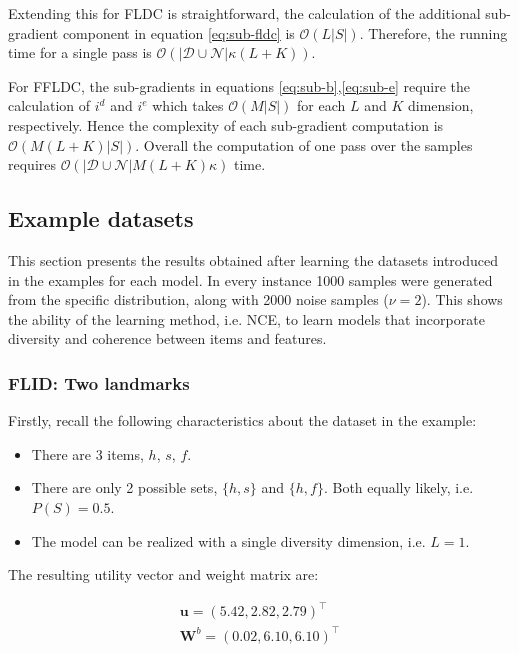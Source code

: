 Extending this for FLDC is straightforward, the calculation of the additional sub-gradient component in equation \ref{eq:sub-fldc} is $\mathcal{O}(L|S|)$. Therefore, the running time for a single pass is $\mathcal{O}(|\mathcal{D}\cup\mathcal{N}|\kappa(L+K))$.

For FFLDC, the sub-gradients in equations \ref{eq:sub-b},\ref{eq:sub-e} require the calculation of $i^{d}$ and $i^{e}$ which takes $\mathcal{O}(M|S|)$ for each $L$ and $K$ dimension, respectively. Hence the complexity of each sub-gradient computation is $\mathcal{O}(M(L+K)|S|)$. Overall the computation of one pass over the samples requires $\mathcal{O}(|\mathcal{D}\cup\mathcal{N}|M(L+K)\kappa)$ time.

\subsection{Example datasets}

This section presents the results obtained after learning the datasets introduced in the examples for each model. In every instance 1000 samples were generated from the specific distribution, along with 2000 noise samples ($\nu = 2$). This shows the ability of the learning method, i.e. NCE, to learn models that incorporate diversity and coherence between items and features.

\subsubsection{FLID: Two landmarks}

Firstly, recall the following characteristics about the dataset in the example:

\begin{itemize}
  \item There are 3 items, $h$, $s$, $f$.
  \item There are only 2 possible sets, $\{h,s\}$ and $\{h,f\}$. Both equally likely, i.e. $P(S) = 0.5$.
  \item The model can be realized with a single diversity dimension, i.e. $L=1$.
\end{itemize}

The resulting utility vector and weight matrix are:

\begin{align*}
  \mathbf{u} = \left(5.42,2.82,2.79\right)^{\intercal} \\
  \mathbf{W}^{b} = \left(0.02, 6.10, 6.10\right)^{\intercal}
\end{align*}

